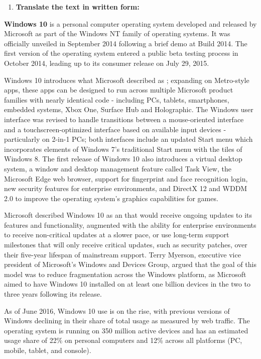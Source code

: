 \documentclass{full}
\begin{document}
\vspace{0.42ex}
\nexttask
\begin{enumerate}[label=\textbf{\Roman*.},start=\gettask]
  \item \textbf{Translate the text in written form:}
  \vspace{-0.7ex}
\end{enumerate}

\textbf{Windows 10} is a personal computer operating system developed and
released by Microsoft as part of the Windows NT family of operating systems. It
was officially unveiled in September 2014 following a brief demo at Build 2014.
The first version of the operating system entered a public beta testing process
in October 2014, leading up to its consumer release on July 29, 2015.

Windows 10 introduces what Microsoft described as ;
expanding on Metro-style apps, these apps can be designed to run across multiple
Microsoft product families with nearly identical code - including PCs, tablets,
smartphones, embedded systems, Xbox One, Surface Hub and Holographic. The
Windows user interface was revised to handle transitions between a
mouse-oriented interface and a touchscreen-optimized interface based on
available input devices - particularly on 2-in-1 PCs; both interfaces include an
updated Start menu which incorporates elements of Windows 7's traditional Start
menu with the tiles of Windows 8. The first release of Windows 10 also
introduces a virtual desktop system, a window and desktop management feature
called Task View, the Microsoft Edge web browser, support for fingerprint and
face recognition login, new security features for enterprise environments, and
DirectX 12 and WDDM 2.0 to improve the operating system's graphics capabilities
for games.

Microsoft described Windows 10 as an  that
would receive ongoing updates to its features and functionality, augmented with
the ability for enterprise environments to receive non-critical updates at a
slower pace, or use long-term support milestones that will only receive critical
updates, such as security patches, over their five-year lifespan of mainstream
support. Terry Myerson, executive vice president of Microsoft's Windows and
Devices Group, argued that the goal of this model was to reduce fragmentation
across the Windows platform, as Microsoft aimed to have Windows 10 installed on
at least one billion devices in the two to three years following its release.

As of June 2016, Windows 10 use is on the rise, with previous versions of
Windows declining in their share of total usage as measured by web traffic. The
operating system is running on 350 million active devices and has an estimated
usage share of 22\% on personal computers and 12\% across all platforms (PC,
mobile, tablet, and console).
\end{document}
